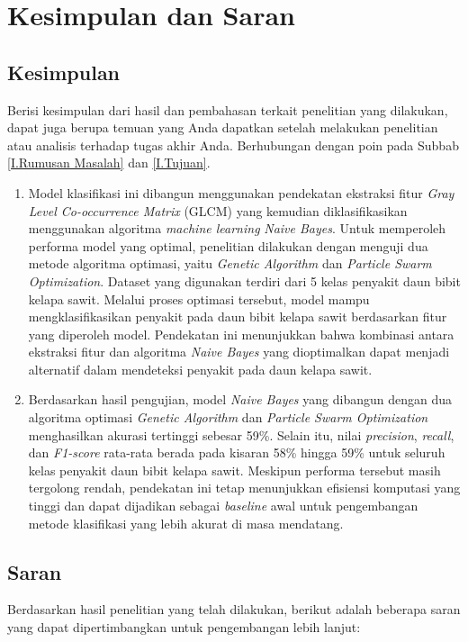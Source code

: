 \newpage
\chapter{Kesimpulan dan Saran} \label{Bab V}

\section{Kesimpulan} \label{V.Kesimpulan}
Berisi kesimpulan dari hasil dan pembahasan terkait penelitian yang dilakukan, dapat juga berupa temuan yang Anda dapatkan setelah melakukan penelitian atau analisis terhadap tugas akhir Anda. Berhubungan dengan poin pada Subbab \ref{I.Rumusan Masalah} dan \ref{I.Tujuan}. 

\begin{enumerate}
    \item Model klasifikasi ini dibangun menggunakan pendekatan ekstraksi fitur \textit{Gray Level Co-occurrence Matrix} (GLCM) yang kemudian diklasifikasikan menggunakan algoritma \textit{machine learning} \textit{Naive Bayes}. Untuk memperoleh performa model yang optimal, penelitian dilakukan dengan menguji dua metode algoritma optimasi, yaitu \textit{Genetic Algorithm} dan \textit{Particle Swarm Optimization}. Dataset yang digunakan terdiri dari 5 kelas penyakit daun bibit kelapa sawit. Melalui proses optimasi tersebut, model mampu mengklasifikasikan penyakit pada daun bibit kelapa sawit berdasarkan fitur yang diperoleh model. Pendekatan ini menunjukkan bahwa kombinasi antara ekstraksi fitur dan algoritma \textit{Naive Bayes} yang dioptimalkan dapat menjadi alternatif dalam mendeteksi penyakit pada daun kelapa sawit.
    
    \item Berdasarkan hasil pengujian, model \textit{Naive Bayes} yang dibangun dengan dua algoritma optimasi \textit{Genetic Algorithm} dan \textit{Particle Swarm Optimization} menghasilkan akurasi tertinggi sebesar 59\%. Selain itu, nilai \textit{precision}, \textit{recall}, dan \textit{F1-score} rata-rata berada pada kisaran 58\% hingga 59\% untuk seluruh kelas penyakit daun bibit kelapa sawit. Meskipun performa tersebut masih tergolong rendah, pendekatan ini tetap menunjukkan efisiensi komputasi yang tinggi dan dapat dijadikan sebagai \textit{baseline} awal untuk pengembangan metode klasifikasi yang lebih akurat di masa mendatang.
\end{enumerate}

\section{Saran} \label{V.Saran}
Berdasarkan hasil penelitian yang telah dilakukan, berikut adalah beberapa saran yang dapat dipertimbangkan untuk pengembangan lebih lanjut:

